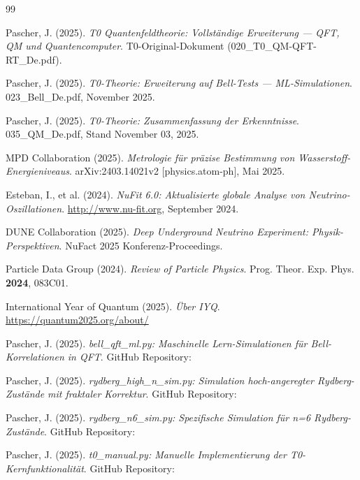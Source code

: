 	\begin{thebibliography}{99}
		
		Pascher, J. (2025). \textit{T0 Quantenfeldtheorie: Vollständige Erweiterung — QFT, QM und Quantencomputer}.
		T0-Original-Dokument (020\_T0\_QM-QFT-RT\_De.pdf).
		
		Pascher, J. (2025). \textit{T0-Theorie: Erweiterung auf Bell-Tests — ML-Simulationen}.
		023\_Bell\_De.pdf, November 2025.
		
		Pascher, J. (2025). \textit{T0-Theorie: Zusammenfassung der Erkenntnisse}.
		035\_QM\_De.pdf, Stand November 03, 2025.
		
		
		MPD Collaboration (2025). \textit{Metrologie für präzise Bestimmung von Wasserstoff-Energieniveaus}.
		arXiv:2403.14021v2 [physics.atom-ph], Mai 2025.
		
		Esteban, I., et al. (2024). \textit{NuFit 6.0: Aktualisierte globale Analyse von Neutrino-Oszillationen}.
		\url{http://www.nu-fit.org}, September 2024.
		
		DUNE Collaboration (2025). \textit{Deep Underground Neutrino Experiment: Physik-Perspektiven}.
		NuFact 2025 Konferenz-Proceedings.
		
		Particle Data Group (2024). \textit{Review of Particle Physics}.
		Prog. Theor. Exp. Phys. \textbf{2024}, 083C01.
		
		International Year of Quantum (2025). \textit{Über IYQ}.
		\url{https://quantum2025.org/about/}

			Pascher, J. (2025). \textit{bell\_qft\_ml.py: Maschinelle Lern-Simulationen für Bell-Korrelationen in QFT}.
			GitHub Repository: 
			
			Pascher, J. (2025). \textit{rydberg\_high\_n\_sim.py: Simulation hoch-angeregter Rydberg-Zustände mit fraktaler Korrektur}.
			GitHub Repository: 
			
			Pascher, J. (2025). \textit{rydberg\_n6\_sim.py: Spezifische Simulation für n=6 Rydberg-Zustände}.
			GitHub Repository: 
			
			Pascher, J. (2025). \textit{t0\_manual.py: Manuelle Implementierung der T0-Kernfunktionalität}.
			GitHub Repository: 
			

\end{thebibliography}
